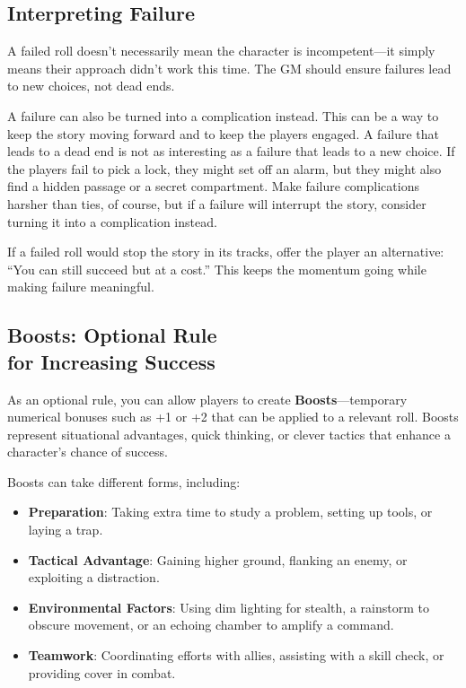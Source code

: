 \begin{multicols}{2}
\subsection{Interpreting Failure}
A failed roll doesn’t necessarily mean the character is incompetent—it simply means their approach didn’t work this time. The GM should ensure failures lead to new choices, not dead ends.

A failure can also be turned into a complication instead. This can be a way to keep the story moving forward and to keep the players engaged. A failure that leads to a dead end is not as interesting as a failure that leads to a new choice. If the players fail to pick a lock, they might set off an alarm, but they might also find a hidden passage or a secret compartment. Make failure complications harsher than ties, of course, but if a failure will interrupt the story, consider turning it into a complication instead.

\begin{GmTips}
    If a failed roll would stop the story in its tracks, offer the player an alternative: “You can still succeed but at a cost.” This keeps the momentum going while making failure meaningful.
\end{GmTips}

\subsection{Boosts: Optional Rule\\ for Increasing Success}

As an optional rule, you can allow players to create \textbf{Boosts}—temporary numerical bonuses such as +1 or +2 that can be applied to a relevant roll. Boosts represent situational advantages, quick thinking, or clever tactics that enhance a character’s chance of success.  

Boosts can take different forms, including:  

\begin{itemize}
    \item \textbf{Preparation}: Taking extra time to study a problem, setting up tools, or laying a trap.  
    \item \textbf{Tactical Advantage}: Gaining higher ground, flanking an enemy, or exploiting a distraction.  
    \item \textbf{Environmental Factors}: Using dim lighting for stealth, a rainstorm to obscure movement, or an echoing chamber to amplify a command.  
    \item \textbf{Teamwork}: Coordinating efforts with allies, assisting with a skill check, or providing cover in combat.  
\end{itemize}


\end{multicols}
